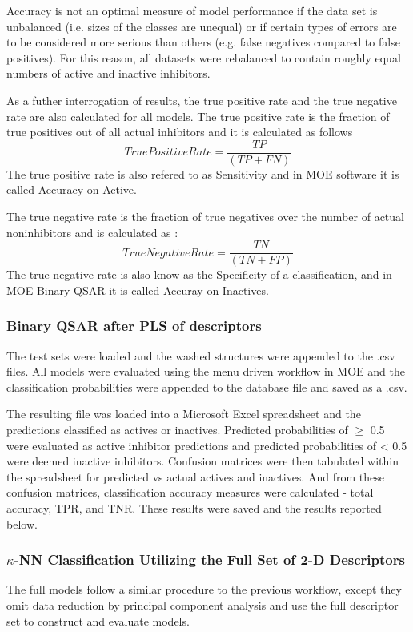 Accuracy is not an optimal measure of model performance if the data set is unbalanced (i.e. sizes of the classes are unequal) or if certain types of errors are to be considered more serious than others (e.g. false negatives compared to false positives). \cite{Lapins2013} For this reason, all datasets were rebalanced to contain roughly equal numbers of active and inactive inhibitors.

As a futher interrogation of results, the true positive rate and the true negative rate are also calculated for all models. The true positive rate is the fraction of true positives out of all actual inhibitors and it is calculated as follows 
$$ True Positive Rate = \frac{TP}{(TP + FN)} $$
The true positive rate is also refered to as Sensitivity and in MOE software it is called Accuracy on Active.

The true negative rate is the fraction of true negatives over the number of actual noninhibitors and is calculated as :
$$ True Negative Rate =\frac{ TN }{(TN + FP)} $$
The true negative rate is also know as the Specificity of a classification, and in MOE Binary QSAR it is called Accuray on Inactives.

\subsubsection{Binary QSAR after PLS of descriptors}
The test sets were loaded and the washed structures were appended to the .csv files. All models were evaluated using the menu driven workflow in MOE and the classification probabilities were appended to the database file and saved as a .csv.  

The resulting file was loaded into a Microsoft Excel spreadsheet and the predictions classified as actives or inactives. Predicted probabilities of $\geq$ 0.5 were evaluated as active inhibitor predictions and predicted probabilities of < 0.5 were deemed inactive inhibitors. Confusion matrices were then tabulated within the spreadsheet for predicted vs actual actives and inactives. And from these confusion matrices, classification accuracy measures were calculated - total accuracy, TPR, and TNR. These results were saved and the results reported below.

\subsubsection{$\kappa$-NN Classification Utilizing the Full Set of 2-D Descriptors}
The full models follow a similar procedure to the previous workflow, except they omit data reduction by principal component analysis and use the full descriptor set to construct and evaluate models. 

